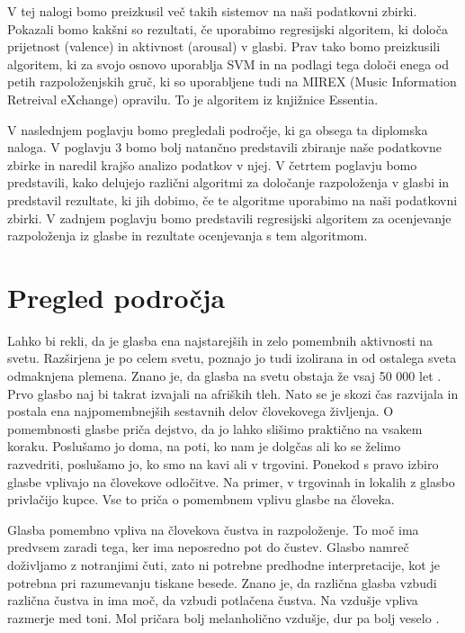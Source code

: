 \documentclass[a4paper, 12pt]{book}
\begin{document}
{V tej nalogi bomo preizkusil več takih sistemov na naši podatkovni zbirki. Pokazali bomo kakšni so rezultati, če uporabimo regresijski algoritem, ki določa prijetnost (valence) in aktivnost (arousal) v glasbi. Prav tako bomo preizkusili algoritem, ki za svojo osnovo uporablja SVM in na podlagi tega določi enega od petih razpoloženjskih gruč, ki so uporabljene tudi na MIREX (Music Information Retreival eXchange) opravilu. To je algoritem iz knjižnice Essentia.

V naslednjem poglavju bomo pregledali področje, ki ga obsega ta diplomska naloga. V poglavju 3 bomo bolj natančno predstavili zbiranje naše podatkovne zbirke in naredil krajšo analizo podatkov v njej. V četrtem poglavju bomo predstavili, kako delujejo različni algoritmi za določanje razpoloženja v glasbi in predstavil rezultate, ki jih dobimo, če te algoritme uporabimo na naši podatkovni zbirki. V zadnjem poglavju bomo predstavili regresijski algoritem za ocenjevanje razpoloženja iz glasbe in rezultate ocenjevanja s tem algoritmom.

\chapter{Pregled področja}

Lahko bi rekli, da je glasba ena najstarejših in zelo pomembnih aktivnosti na svetu. Razširjena je po celem svetu, poznajo jo tudi izolirana in od ostalega sveta odmaknjena plemena. Znano je, da glasba na svetu obstaja že vsaj 50 000 let \cite{Krause2012}. Prvo glasbo naj bi takrat izvajali na afriških tleh. Nato se je skozi čas razvijala in postala ena najpomembnejših sestavnih delov človekovega življenja. O pomembnosti glasbe priča dejstvo, da jo lahko slišimo praktično na vsakem koraku. Poslušamo jo doma, na poti, ko nam je dolgčas ali ko se želimo razvedriti, poslušamo jo, ko smo na kavi ali v trgovini. Ponekod s pravo izbiro glasbe vplivajo na človekove odločitve. Na primer, v trgovinah in lokalih z glasbo privlačijo kupce. Vse to priča o pomembnem vplivu glasbe na človeka.  

Glasba pomembno vpliva na človekova čustva in razpoloženje. To moč ima predvsem zaradi tega, ker ima neposredno pot do čustev. Glasbo namreč do\-živ\-lja\-mo z notranjimi čuti, zato ni potrebne predhodne interpretacije, kot je potrebna pri razumevanju tiskane besede.  Znano je, da različna glasba vzbudi različna čustva in ima moč, da vzbudi potlačena čustva. Na vzdušje vpliva razmerje med toni. Mol pričara bolj melanholično vzdušje, dur pa bolj veselo \cite{lenko2009pomen}.

}
\end{document}
